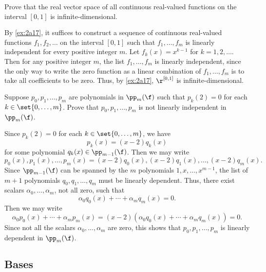 \begin{exercise}[2a19]
    Prove that the real vector space of all continuous real-valued functions on the interval $[0, 1]$ is infinite-dimensional.
\end{exercise}

\begin{sol}
    By \autoref{ex:2a17}, it suffices to construct a sequence of continuous real-valued functions $f_1, f_2, \ldots$ on the interval $[0, 1]$ such that $f_1, \ldots, f_m$ is linearly independent for every positive integer $m$. Let $f_k(x) = x^{k-1}$ for $k = 1, 2, \ldots$. Then for any positive integer $m$, the list $f_1, \ldots, f_m$ is linearly independent, since the only way to write the zero function as a linear combination of $f_1, \ldots, f_m$ is to take all coefficients to be zero. Thus, by \autoref{ex:2a17}, $\r^{[0, 1]}$ is infinite-dimensional.
\end{sol}
 
\begin{exercise}[2a20]
    Suppose $p_0, p_1, \ldots, p_m$ are polynomials in $\pp_m(\f)$ such that $p_k(2) = 0$ for each $k \in \set{0, \ldots, m}$. Prove that $p_0, p_1, \ldots, p_m$ is not linearly independent in $\pp_m(\f)$.
\end{exercise}

\begin{sol}
    Since $p_k(2) = 0$ for each $k \in \set{0, \ldots, m}$, we have
    \[p_k(x) = (x - 2)q_k(x)\]
    for some polynomial $q_k(x) \in \pp_{m-1}(\f)$. Then we may write
    \[p_0(x), p_1(x), \ldots, p_m(x) = (x - 2)q_0(x), (x - 2)q_1(x), \ldots, (x - 2)q_m(x).\]
    Since $\pp_{m - 1}(\f)$ can be spanned by the $m$ polynomials $1, x, \ldots, x^{m-1}$, the list of $m + 1$ polynomials $q_0, q_1, \ldots, q_m$ must be linearly dependent. Thus, there exist scalars $\alpha_0, \ldots, \alpha_m$, not all zero, such that
    \[\alpha_0 q_0(x) + \cdots + \alpha_m q_m(x) = 0.\]
    Then we may write
    \[\alpha_0 p_0(x) + \cdots + \alpha_m p_m(x) = (x - 2)(\alpha_0 q_0(x) + \cdots + \alpha_m q_m(x)) = 0.\]
    Since not all the scalars $\alpha_0, \ldots, \alpha_m$ are zero, this shows that $p_0, p_1, \ldots, p_m$ is linearly dependent in $\pp_m(\f)$.
\end{sol}

\newpage

\subsection{Bases}

